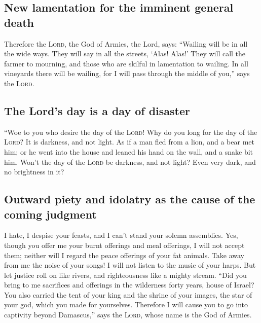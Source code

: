 \hypertarget{new-lamentation-for-the-imminent-general-death}{%
\subsection{New lamentation for the imminent general
death}\label{new-lamentation-for-the-imminent-general-death}}

 Therefore the \textsc{Lord}, the God of Armies, the
Lord, says: ``Wailing will be in all the wide ways. They will say in all
the streets, `Alas! Alas!' They will call the farmer to mourning, and
those who are skilful in lamentation to wailing.  In all
vineyards there will be wailing, for I will pass through the middle of
you,'' says the \textsc{Lord}.

\hypertarget{the-lords-day-is-a-day-of-disaster}{%
\subsection{The Lord's day is a day of
disaster}\label{the-lords-day-is-a-day-of-disaster}}

 ``Woe to you who desire the day of the \textsc{Lord}!
Why do you long for the day of the \textsc{Lord}? It is darkness, and
not light.  As if a man fled from a lion, and a bear met
him; or he went into the house and leaned his hand on the wall, and a
snake bit him.  Won't the day of the \textsc{Lord} be
darkness, and not light? Even very dark, and no brightness in it?

\hypertarget{outward-piety-and-idolatry-as-the-cause-of-the-coming-judgment}{%
\subsection{Outward piety and idolatry as the cause of the coming
judgment}\label{outward-piety-and-idolatry-as-the-cause-of-the-coming-judgment}}

 I hate, I despise your feasts, and I can't stand your
solemn assemblies.  Yes, though you offer me your burnt
offerings and meal offerings, I will not accept them; neither will I
regard the peace offerings of your fat animals.  Take
away from me the noise of your songs! I will not listen to the music of
your harps.  But let justice roll on like rivers, and
righteousness like a mighty stream.  ``Did you bring to
me sacrifices and offerings in the wilderness forty years, house of
Israel?  You also carried the tent of your king and the
shrine of your images, the star of your god, which you made for
yourselves.  Therefore I will cause you to go into
captivity beyond Damascus,'' says the \textsc{Lord}, whose name is the
God of Armies.

